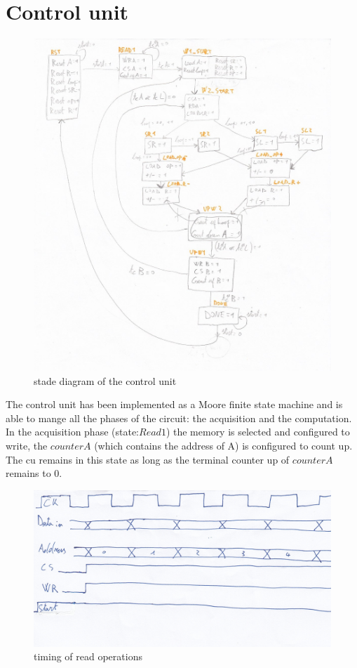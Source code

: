\documentclass[12pt]{article}
\begin{document}
\section*{Control unit}
\begin{figure}[h]
	\centering
	\includegraphics[scale = 0.85]{immagini/fsm.jpg}
	\caption{stade diagram of the control unit}
\end{figure}

The control unit has been implemented as a Moore finite state machine and is able to mange all the phases of the circuit: the acquisition and the computation.   \\
In the acquisition phase (state:$Read1$) the memory is selected and configured to write, the $counterA$ (which contains the address of A) is configured to count up. The cu remains in this state as long as the terminal counter up of $counterA$ remains to 0. \\

\begin{figure}[h]
	\centering
	\includegraphics[scale = 0.55]{immagini/timing1.jpg}
	\caption{timing of read operations}
\end{figure}
\end{document}
